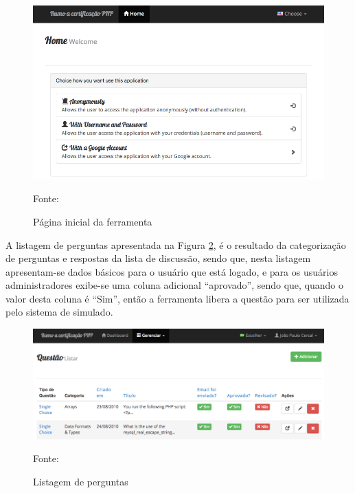 \begin{figure}[h!tb]
	\caption{Página inicial da ferramenta}
	\label{fig:zcpeHome}

	\centering
	\includegraphics[width=\textwidth]{images/resultados/zcpe-home.png}

	\centering
	\footnotesize Fonte: \fonteOAutor
\end{figure}

\FloatBarrier 	%

A listagem de perguntas apresentada na Figura \ref{fig:zcpePerguntaListagem}, é
o resultado da categorização de perguntas e respostas da lista de discussão,
sendo que, nesta listagem apresentam-se dados básicos para o usuário que está logado, e para os usuários
administradores exibe-se uma coluna adicional ``aprovado'', sendo que, quando
o valor desta coluna é ``Sim'', então a ferramenta libera a questão
para ser utilizada pelo sistema de simulado.

\begin{figure}[h!tb]
	\caption{Listagem de perguntas}
	\label{fig:zcpePerguntaListagem}

	\centering
	\includegraphics[width=\textwidth]{images/resultados/zcpe-pergunta-listagem.png}

	\centering
	\footnotesize Fonte: \fonteOAutor
\end{figure}

